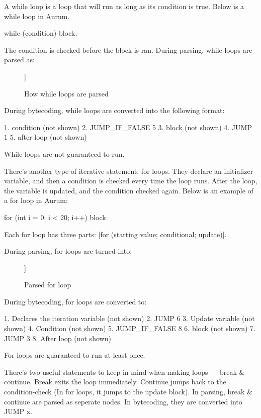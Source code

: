 \documentclass[12pt, letterpaper, oneside]{article}
\begin{document}
	A while loop is a loop that will run as long as its condition is true. Below is a while loop in Aurum.
	\begin{spverbatim}
		while (condition) {
			block;
		}
	\end{spverbatim} \newpage
	The condition is checked before the block is ran. During parsing, while loops are parsed as:
	
	
	\begin{figure}[h]
		\begin{forest}
			[WHILE
			[Left: condition]
			[Right: block]
			]
		\end{forest}
		\caption{How while loops are parsed}
	\end{figure} 
	During bytecoding, while loops are converted into the following format:
	\begin{spverbatim}
		1. condition (not shown)
		2. JUMP_IF_FALSE 5
		3. block (not shown)
		4. JUMP 1
		5. after loop (not shown)	
	\end{spverbatim} 
	While loops are not guaranteed to run.
	
	There's another type of iterative statement: for loops. They declare an initializer variable, and then a condition is checked every time the loop runs. After the loop, the variable is updated, and the condition checked again. Below is an example of a for loop in Aurum:
	\begin{spverbatim}
		for (int i = 0; i < 20; i++) {
			block
		}
	\end{spverbatim}
	Each for loop has three parts: \spverb|for (starting value; conditional; update)|. 
	
	During parsing, for loops are turned into:
	\begin{figure}[h]
		\begin{forest}
			[FORLoop
			[Left: Initialization]
			[Right: Condition]
			[child0: Update]
			[child1: Block]
			]
		\end{forest}	
		\caption{Parsed for loop}
	\end{figure} 
	\newpage
	During bytecoding, for loops are converted to:
	\begin{spverbatim}
		1. Declares the iteration variable (not shown)
		2. JUMP 6
		3. Update variable (not shown)
		4. Condition (not shown)
		5. JUMP_IF_FALSE 8
		6. block (not shown)
		7. JUMP 3
		8. After loop (not shown)
	\end{spverbatim}
	For loops are guaranteed to run at least once.
	
	There's two useful statements to keep in mind when making loops --- break \& continue. Break exits the loop immediately. Continue jumps back to the condition-check (In for loops, it jumps to the update block). In parsing, break \& continue are parsed as seperate nodes. In bytecoding, they are converted into JUMP x.
\end{document}
